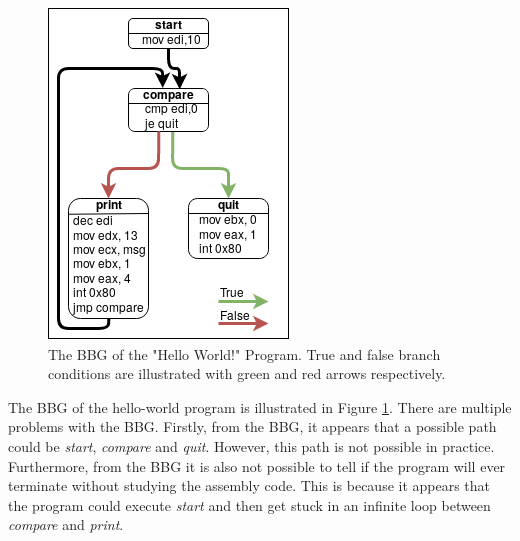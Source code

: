 \documentclass{kththesis}
\renewcommand{\it}[1]{\textit{#1}}
\begin{document}
\begin{figure}[ht]
    \centering
    \includegraphics[scale=0.6]{Images/BBGExample.png}
    \caption[The BBG of the "Hello World!" Program.]{The BBG of the "Hello World!" Program. True and false branch conditions are illustrated with green and red arrows respectively.}
    \label{fig:HelloBBG}
\end{figure}
\clearpage
\noindent
The BBG of the hello-world program is illustrated in Figure \ref{fig:HelloBBG}. There are multiple problems with the BBG. Firstly, from the BBG, it appears that a possible path could be \it{start}, \it{compare} and \it{quit}. However, this path is not possible in practice. Furthermore, from the BBG it is also not possible to tell if the program will ever terminate without studying the assembly code. This is because it appears that the program could execute \it{start} and then get stuck in an infinite loop between \it{compare} and \it{print}.
\end{document}
